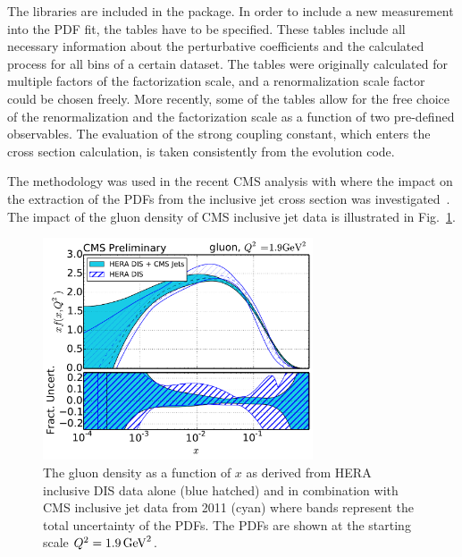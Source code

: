 \begin{description}
\begin{itemize}
The  \fastnlo  libraries are included in the \fitter package.
In order to include a new measurement into the PDF fit,
the \fastnlo tables have to be specified. These tables include all
necessary information about the perturbative coefficients and the
calculated process for all bins of a certain dataset. 
%
The \fastnlo tables were originally calculated
for multiple factors of the factorization scale, 
and a renormalization scale factor could be chosen freely.
More recently, some of the \fastnlo tables allow for 
the free choice~\cite{Britzger:2012bs} of the renormalization and the factorization
scale as a function of two pre-defined observables.
The evaluation of the strong coupling constant, which enters
the cross section calculation, is taken consistently from the 
\qcdnum evolution code.

The \fastnlo methodology was used in the recent CMS analysis with \fitter where the impact
on the extraction of the PDFs from the inclusive jet cross section was investigated~\cite{cms:jets}. 
The impact of the gluon density of CMS inclusive jet data is illustrated in Fig.~\ref{fig:cmsjet}.
\begin{figure}[!ht]
   \centering
   \includegraphics[width=8cm]{CMSjets.pdf}
   \caption{The gluon density as a function of $x$ as derived from HERA inclusive DIS data 
            alone (blue hatched) and in combination with CMS inclusive jet data from 2011 (cyan)
            where bands represent the total uncertainty of the PDFs. 
            The PDFs are shown at the starting scale $Q^2= 1.9 \,\text{Ge\hspace{-.08em}V}^2$.}
 \label{fig:cmsjet}
\end{figure}


\end{itemize}

\end{description}

